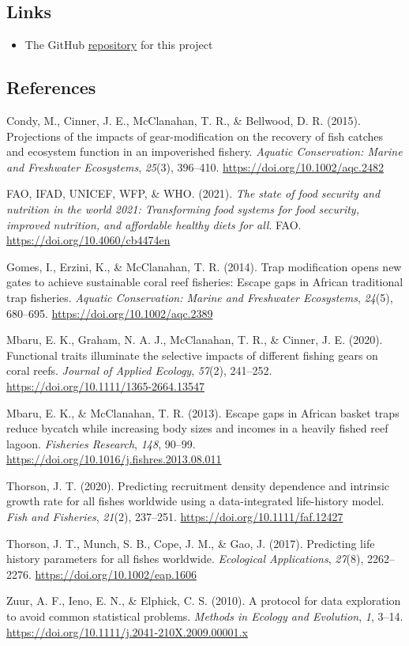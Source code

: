 \documentclass[
]{article}
\providecommand{\tightlist}{%
  \setlength{\itemsep}{0pt}\setlength{\parskip}{0pt}}
\begin{document}
\hypertarget{links}{%
\subsection{Links}\label{links}}

\begin{itemize}
\tightlist
\item
  The GitHub
  \href{https://github.com/bryanpgalligan/FishTrapsFoodSec}{repository}
  for this project
\end{itemize}

\hypertarget{references}{%
\subsection{References}\label{references}}

Condy, M., Cinner, J. E., McClanahan, T. R., \& Bellwood, D. R. (2015).
Projections of the impacts of gear-modification on the recovery of fish
catches and ecosystem function in an impoverished fishery. \emph{Aquatic
Conservation: Marine and Freshwater Ecosystems}, \emph{25}(3), 396--410.
\url{https://doi.org/10.1002/aqc.2482}

FAO, IFAD, UNICEF, WFP, \& WHO. (2021). \emph{The state of food security
and nutrition in the world 2021: Transforming food systems for food
security, improved nutrition, and affordable healthy diets for all}.
FAO. \url{https://doi.org/10.4060/cb4474en}

Gomes, I., Erzini, K., \& McClanahan, T. R. (2014). Trap modification
opens new gates to achieve sustainable coral reef fisheries: Escape gaps
in African traditional trap fisheries. \emph{Aquatic Conservation:
Marine and Freshwater Ecosystems}, \emph{24}(5), 680--695.
\url{https://doi.org/10.1002/aqc.2389}

Mbaru, E. K., Graham, N. A. J., McClanahan, T. R., \& Cinner, J. E.
(2020). Functional traits illuminate the selective impacts of different
fishing gears on coral reefs. \emph{Journal of Applied Ecology},
\emph{57}(2), 241--252. \url{https://doi.org/10.1111/1365-2664.13547}

Mbaru, E. K., \& McClanahan, T. R. (2013). Escape gaps in African basket
traps reduce bycatch while increasing body sizes and incomes in a
heavily fished reef lagoon. \emph{Fisheries Research}, \emph{148},
90--99. \url{https://doi.org/10.1016/j.fishres.2013.08.011}

Thorson, J. T. (2020). Predicting recruitment density dependence and
intrinsic growth rate for all fishes worldwide using a data-integrated
life-history model. \emph{Fish and Fisheries}, \emph{21}(2), 237--251.
\url{https://doi.org/10.1111/faf.12427}

Thorson, J. T., Munch, S. B., Cope, J. M., \& Gao, J. (2017). Predicting
life history parameters for all fishes worldwide. \emph{Ecological
Applications}, \emph{27}(8), 2262--2276.
\url{https://doi.org/10.1002/eap.1606}

Zuur, A. F., Ieno, E. N., \& Elphick, C. S. (2010). A protocol for data
exploration to avoid common statistical problems. \emph{Methods in
Ecology and Evolution}, \emph{1}, 3--14.
\url{https://doi.org/10.1111/j.2041-210X.2009.00001.x}
\end{document}
